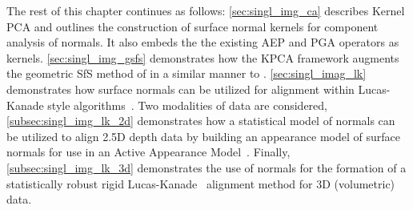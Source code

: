 The rest of this chapter continues as follows:
\cref{sec:singl_img_ca} describes Kernel PCA and outlines the construction of
surface normal kernels for component analysis of normals. It also embeds the the
existing AEP and PGA operators as kernels.
\cref{sec:singl_img_gsfs} demonstrates how the KPCA framework augments
the geometric SfS method of \citet{worthington1999new} in a similar manner to
\citet{smith2006recovering}. \cref{sec:singl_imag_lk} demonstrates how surface
normals can be utilized for alignment within Lucas-Kanade style
algorithms~\cite{lucas1981iterative}. Two modalities of data are considered,
\cref{subsec:singl_img_lk_2d} demonstrates how a statistical model of normals can be
utilized to align 2.5D depth data by building an appearance model of surface
normals for use in an Active Appearance Model~\cite{cootes2001active}. Finally,
\cref{subsec:singl_img_lk_3d} demonstrates the use of normals for the formation of
a statistically robust rigid Lucas-Kanade~\cite{lucas1981iterative} alignment
method for 3D (volumetric) data.
{
\newcommand{\aepname}{\operatorname{AEP}}
\newcommand{\ipname}{\operatorname{IP}}
\newcommand{\sphername}{\operatorname{SPHER}}
\newcommand{\pganame}{\operatorname{PGA}}
\newcommand{\lsname}{\operatorname{LS}}

\newcommand{\ip}{\Phi_{\ipname} (\bb{x}_k)}
\newcommand{\invip}{{\Phi_{\ipname}}^{-1} (\bb{v}_k)}
\newcommand{\spher}{\Phi_{\sphername} (\bb{x}_k)}
\newcommand{\invspher}{{\Phi_{\sphername}}^{-1} (\bb{v}_k)}
\newcommand{\aep}{\Phi_{\aepname} (\bb{x}_k)}
\newcommand{\invaep}{{\Phi_{\aepname}}^{-1} (\bb{v}_k)}
\newcommand{\pga}{\Phi_{\pganame} (\bb{x}_k)}
\newcommand{\invpga}{{\Phi_{\pganame}}^{-1} (\bb{v}_k)}
\newcommand{\ls}{\Phi_{\lsname} (\bb{x}_k)}
\newcommand{\invls}{{\Phi_{\lsname}}^{-1} (\bb{v}_k)}


\newcommand{\g}{\bb{g}}
\newcommand{\tildeg}{\bb{\tilde{g}}}
\newcommand{\W}{\bb{W}}
\newcommand{\deltap}{\bb{\Delta{} p}}
\newcommand{\x}{\bb{x}}
\newcommand{\I}{\bb{I}}
\newcommand{\GTwo}{\bb{G_2}}
\newcommand{\GOne}{\bb{G_1}}
\newcommand{\J}{\bb{J}}
\newcommand{\zero}{\bb{0}}
\newcommand{\p}{\bb{p}}



}
\stopcontents[chapters]
